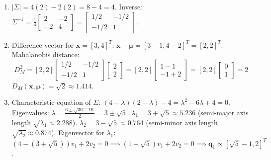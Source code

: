 \begin{enumerate}[label=(\alph*)]
    \item $|\Sigma| = 4(2) - 2(2) = 8 - 4 = 4$.
    Inverse: $\Sigma^{-1} = \frac{1}{4}\begin{bmatrix} 2 & -2 \\ -2 & 4 \end{bmatrix} = \begin{bmatrix} 1/2 & -1/2 \\ -1/2 & 1 \end{bmatrix}$.
    \item Difference vector for $\mathbf{x} = [3, 4]^T$: $\mathbf{x} - \boldsymbol{\mu} = [3 - 1, 4 - 2]^T = [2, 2]^T$.
    Mahalanobis distance:
    \begin{equation*}
    D_M^2 = [2, 2] \begin{bmatrix} 1/2 & -1/2 \\ -1/2 & 1 \end{bmatrix} \begin{bmatrix} 2 \\ 2 \end{bmatrix} = [2, 2] \begin{bmatrix} 1 - 1 \\ -1 + 2 \end{bmatrix} = [2, 2] \begin{bmatrix} 0 \\ 1 \end{bmatrix} = 2
    \end{equation*}
    $D_M(\mathbf{x}, \boldsymbol{\mu}) = \sqrt{2} \approx 1.414$.
    \item Characteristic equation of $\Sigma$: $(4 - \lambda)(2 - \lambda) - 4 = \lambda^2 - 6\lambda + 4 = 0$.
    Eigenvalues: $\lambda = \frac{6 \pm \sqrt{36 - 16}}{2} = 3 \pm \sqrt{5}$.
    $\lambda_1 = 3 + \sqrt{5} \approx 5.236$ (semi-major axis length $\sqrt{\lambda_1} \approx 2.288$).
    $\lambda_2 = 3 - \sqrt{5} \approx 0.764$ (semi-minor axis length $\sqrt{\lambda_2} \approx 0.874$).
    Eigenvector for $\lambda_1$: $(4 - (3+\sqrt{5}))v_1 + 2v_2 = 0 \implies (1 - \sqrt{5})v_1 + 2v_2 = 0 \implies \mathbf{q}_1 \propto [\sqrt{5}-1, 2]^T$.
\end{enumerate}

